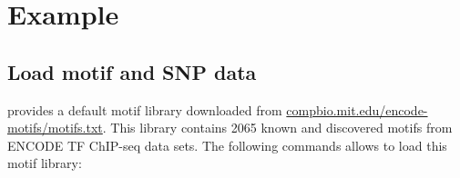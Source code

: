 \documentclass[a4paper,10pt]{article}
\begin{document}
\section{Example}

\subsection{Load motif and SNP data}

 provides a default motif library downloaded from \url{compbio.mit.edu/encode-motifs/motifs.txt}. This library contains 2065 known and discovered motifs from ENCODE TF ChIP-seq data sets. The following commands allows to load this motif library:


\end{document}

